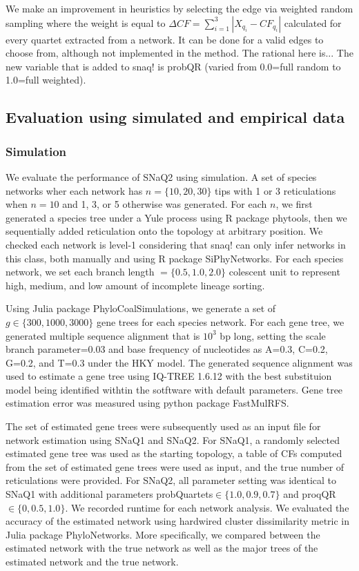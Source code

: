 \documentclass[unnumsec,webpdf,contemporary,large]{oup-authoring-template}%
\theoremstyle{thmstyleone}%
\theoremstyle{thmstyletwo}%
\theoremstyle{thmstylethree}%
\begin{document}
We make an improvement in heuristics by selecting the edge via weighted random sampling where the weight is equal to $\Delta CF=\sum^3_{i=1}\left|X_{q_i}-CF_{q_i}\right|$ calculated for every quartet extracted from a network. It can be done for a valid edges to choose from, although not implemented in the method. The rational here is... The new variable that is added to snaq! is probQR (varied from 0.0=full random to 1.0=full weighted).






\subsection{Evaluation using simulated and empirical data}\label{subsec3}
\subsubsection{Simulation}
We evaluate the performance of SNaQ2 using simulation. A set of species networks wher each network has $n=\{10, 20, 30\}$ tips with 1 or 3 reticulations when $n=10$ and 1, 3, or 5 otherwise was generated. For each $n$, we first generated a species tree under a Yule process using R package phytools, then we sequentially added reticulation onto the topology at arbitrary position. We checked each network is level-1 considering that snaq! can only infer networks in this class, both manually and using R package SiPhyNetworks. For each species network, we set each branch length $=\{0.5,1.0,2.0\}$ colescent unit to represent high, medium, and low amount of incomplete lineage sorting.

Using Julia package PhyloCoalSimulations, we generate a set of $g\in\{300, 1000, 3000\}$ gene trees for each species network. For each gene tree, we generated multiple sequence alignment that is $10^3$ bp long, setting the scale branch parameter=0.03 and base frequency of nucleotides as A=0.3, C=0.2, G=0.2, and T=0.3 under the HKY model. The generated sequence alignment was used to estimate a gene tree using IQ-TREE 1.6.12 with the best substituion model being identified withtin the sotftware with default parameters. Gene tree estimation error was measured using python package FastMulRFS.

The set of estimated gene trees were subsequently used as an input file for network estimation using SNaQ1 and SNaQ2. For SNaQ1, a randomly selected estimated gene tree was used as the starting topology, a table of CFs computed from the set of estimated gene trees were used as input, and the true number of reticulations were provided. For SNaQ2, all parameter setting was identical to SNaQ1 with additional parameters probQuartets$\in\{1.0, 0.9, 0.7\}$ and proqQR$\in\{0,0.5,1.0\}$. We recorded runtime for each network analysis. We evaluated the accuracy of the estimated network using hardwired cluster dissimilarity metric in Julia package PhyloNetworks. More specifically, we compared between the estimated network with the true network as well as the major trees of the estimated network and the true network. 
\end{document}
